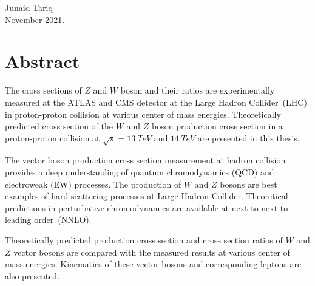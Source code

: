 \documentclass[a4paper,12pt]{report}
\numberwithin{equation}{section}
\begin{document}
\begin{flushright}
Junaid Tariq\\
November 2021.
\end{flushright}



    \newpage
    \chapter*{Abstract}
    The cross sections of $Z$ and $W$ boson and their ratios are experimentally measured at the ATLAS and CMS detector at the Large Hadron Collider~(LHC) in proton-proton collision at various center of mass energies. Theoretically predicted cross section of the $W$ and $Z$ boson production cross section in a proton-proton collision at $\sqrt{s}=13~TeV$ and $14~TeV$ are presented in this thesis.

The vector boson production cross section measurement at hadron collision provides a deep understanding of quantum chromodynamics (QCD) and electroweak (EW) processes. The production of $W$ and $Z$ bosons are best examples of hard scattering processes at Large Hadron Collider. Theoretical predictions in perturbative chromodynamics are available at next-to-next-to-leading order~(NNLO).

Theoretically predicted production cross section and cross section ratios of $W$ and $Z$ vector bosons are compared with the measured results at various center of mass energies. Kinematics of these vector bosons and corresponding leptons are also presented.        


    \newpage
    \tableofcontents

    \listoffigures
    \listoftables

    

    \newpage








\printbibliography
\end{document}
